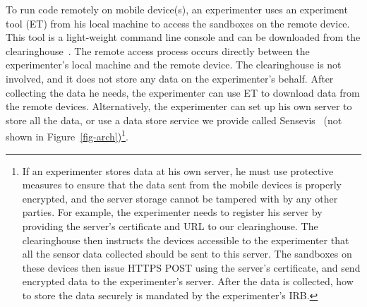 To run code remotely on mobile device(s), an experimenter uses an
experiment tool (ET) from his local machine 
to access the sandboxes on the remote device. This tool is a 
light-weight command line console and can
be downloaded from the clearinghouse~\cite{demo-kit}.
The remote access process
occurs directly between the experimenter's local machine and the 
remote device. The clearinghouse is not involved, and it does not store any
data on the experimenter's behalf. After collecting the data he needs, the
experimenter can use ET to download data from the remote devices. 
Alternatively, the experimenter can set up his own server to store all 
the data, or use a data store service we provide called Sensevis~\cite{sensevis} 
(not shown in Figure~\ref{fig-arch})\footnote{
If an experimenter stores data at his own server, he must use protective
measures to ensure that the data sent from the mobile devices is
properly encrypted, and the server storage cannot be tampered
with by any other parties. For example, the experimenter needs to register
his server by providing the server's certificate and URL to our
clearinghouse. The clearinghouse then instructs the devices
accessible to the experimenter that all the sensor data collected should be
sent to this server. The sandboxes on these devices then issue
HTTPS POST using the server's certificate, and send encrypted
data to the experimenter's server. After the data is collected, how to store
the data securely is mandated by the experimenter's IRB.}.

